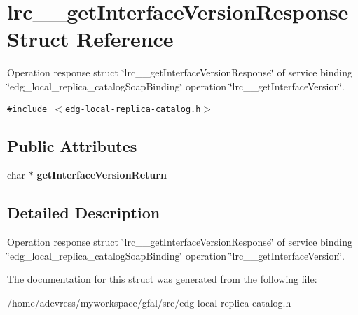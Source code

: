 \section{lrc\_\-\_\-get\-Interface\-Version\-Response Struct Reference}
\label{structlrc____getInterfaceVersionResponse}
Operation response struct \char`\"{}lrc\_\-\_\-get\-Interface\-Version\-Response\char`\"{} of service binding \char`\"{}edg\_\-local\_\-replica\_\-catalog\-Soap\-Binding\char`\"{} operation \char`\"{}lrc\_\-\_\-get\-Interface\-Version\char`\"{}.  


{\tt \#include $<$edg-local-replica-catalog.h$>$}

\subsection*{Public Attributes}
\begin{CompactItemize}
\item 
char $\ast$ \textbf{get\-Interface\-Version\-Return}\label{structlrc____getInterfaceVersionResponse_8d56d419326406696223406d50225c0f}

\end{CompactItemize}


\subsection{Detailed Description}
Operation response struct \char`\"{}lrc\_\-\_\-get\-Interface\-Version\-Response\char`\"{} of service binding \char`\"{}edg\_\-local\_\-replica\_\-catalog\-Soap\-Binding\char`\"{} operation \char`\"{}lrc\_\-\_\-get\-Interface\-Version\char`\"{}. 



The documentation for this struct was generated from the following file:\begin{CompactItemize}
\item 
/home/adevress/myworkspace/gfal/src/edg-local-replica-catalog.h\end{CompactItemize}
